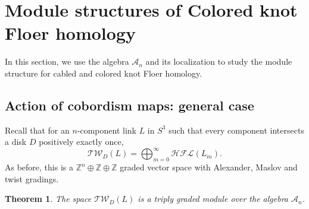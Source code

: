 \documentclass{amsart}
\newtheorem{theorem}{Theorem}[section]
\newcommand{\CA}{\mathcal{A}}
\newcommand{\Cab}{\mathrm{Cab}}
\newcommand{\Tw}{\mathcal{TW}}
\newcommand{\cHFL}{\mathcal{H\!F\! L}}
\newcommand{\Z}{\mathbb{Z}}
\newcommand{\A}{\mathfrak{A}}
\newcommand{\cc}{\mathbf{c}}
\begin{document}

 



\section{Module structures of Colored knot Floer homology}

In this section, we use the algebra $\CA_n$ and its localization to study the module structure for cabled and colored knot Floer homology. 

\subsection{Action of cobordism maps: general case}
Recall that for an $n$-component link $L$ in $S^3$ such that every component intersects a disk $D$ positively exactly once, 
$$
\Tw_D(L)=\bigoplus_{m=0}^{\infty}\cHFL(L_m).
$$
As before, this is a $\Z^n\oplus \Z\oplus \Z$ graded vector space with Alexander, Maslov and twist gradings.


\begin{theorem}
\label{thm: cabled module}
The space $\Tw_D(L)$ is a triply graded module over the algebra $\CA_n$.
\end{theorem}
\end{document}

